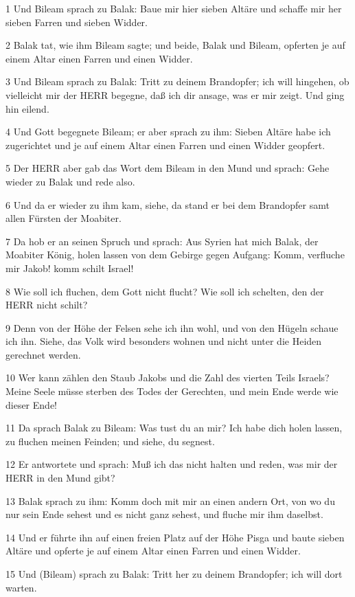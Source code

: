 \par 1 Und Bileam sprach zu Balak: Baue mir hier sieben Altäre und schaffe mir her sieben Farren und sieben Widder.
\par 2 Balak tat, wie ihm Bileam sagte; und beide, Balak und Bileam, opferten je auf einem Altar einen Farren und einen Widder.
\par 3 Und Bileam sprach zu Balak: Tritt zu deinem Brandopfer; ich will hingehen, ob vielleicht mir der HERR begegne, daß ich dir ansage, was er mir zeigt. Und ging hin eilend.
\par 4 Und Gott begegnete Bileam; er aber sprach zu ihm: Sieben Altäre habe ich zugerichtet und je auf einem Altar einen Farren und einen Widder geopfert.
\par 5 Der HERR aber gab das Wort dem Bileam in den Mund und sprach: Gehe wieder zu Balak und rede also.
\par 6 Und da er wieder zu ihm kam, siehe, da stand er bei dem Brandopfer samt allen Fürsten der Moabiter.
\par 7 Da hob er an seinen Spruch und sprach: Aus Syrien hat mich Balak, der Moabiter König, holen lassen von dem Gebirge gegen Aufgang: Komm, verfluche mir Jakob! komm schilt Israel!
\par 8 Wie soll ich fluchen, dem Gott nicht flucht? Wie soll ich schelten, den der HERR nicht schilt?
\par 9 Denn von der Höhe der Felsen sehe ich ihn wohl, und von den Hügeln schaue ich ihn. Siehe, das Volk wird besonders wohnen und nicht unter die Heiden gerechnet werden.
\par 10 Wer kann zählen den Staub Jakobs und die Zahl des vierten Teils Israels? Meine Seele müsse sterben des Todes der Gerechten, und mein Ende werde wie dieser Ende!
\par 11 Da sprach Balak zu Bileam: Was tust du an mir? Ich habe dich holen lassen, zu fluchen meinen Feinden; und siehe, du segnest.
\par 12 Er antwortete und sprach: Muß ich das nicht halten und reden, was mir der HERR in den Mund gibt?
\par 13 Balak sprach zu ihm: Komm doch mit mir an einen andern Ort, von wo du nur sein Ende sehest und es nicht ganz sehest, und fluche mir ihm daselbst.
\par 14 Und er führte ihn auf einen freien Platz auf der Höhe Pisga und baute sieben Altäre und opferte je auf einem Altar einen Farren und einen Widder.
\par 15 Und (Bileam) sprach zu Balak: Tritt her zu deinem Brandopfer; ich will dort warten.

